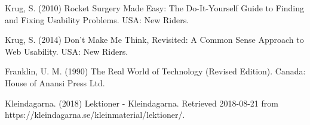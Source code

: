 \makeatletter
\renewcommand\@biblabel[1]{}
\makeatother

\begin{thebibliography}{69}

   Krug, S. (2010) Rocket Surgery Made Easy: The Do-It-Yourself Guide to Finding and Fixing Usability Problems. USA: New Riders.

   Krug, S. (2014) Don't Make Me Think, Revisited: A Common Sense Approach to Web Usability. USA: New Riders.

   Franklin, U. M. (1990) The Real World of Technology (Revised Edition). Canada: House of Anansi Press Ltd.

   Kleindagarna. (2018) Lektioner - Kleindagarna. Retrieved 2018-08-21 from https://kleindagarna.se/kleinmaterial/lektioner/.

\end{thebibliography}
